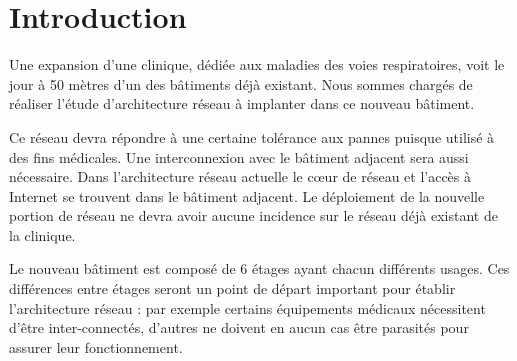 \section*{Introduction} %

%
%
Une expansion d'une clinique, dédiée aux maladies des voies respiratoires, voit le jour à 50 mètres d'un des bâtiments déjà existant.
Nous sommes chargés de réaliser l'étude d'architecture réseau à implanter dans ce nouveau bâtiment.

%
%
Ce réseau devra répondre à une certaine tolérance aux pannes puisque utilisé à des fins médicales.
Une interconnexion avec le bâtiment adjacent sera aussi nécessaire.
Dans l'architecture réseau actuelle le cœur de réseau et l'accès à Internet se trouvent dans le bâtiment adjacent.
Le déploiement de la nouvelle portion de réseau ne devra avoir aucune incidence sur le réseau déjà existant de la clinique.

%
%
Le nouveau bâtiment est composé de 6 étages ayant chacun différents usages.
Ces différences entre étages seront un point de départ important pour établir l'architecture réseau :
par exemple certains équipements médicaux nécessitent d'être inter-connectés, d'autres ne doivent en aucun cas être parasités pour assurer leur fonctionnement.

%
%
